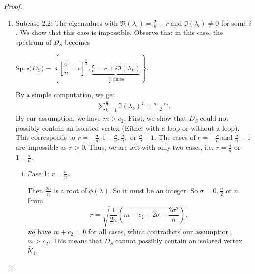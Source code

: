 \documentclass[12pt,a4paper,reqno]{amsart}
\numberwithin{equation}{section}
\theoremstyle{plain}
\theoremstyle{definition}
\newcommand{\<}{\langle}
\renewcommand{\>}{\rangle}
\begin{document}
\begin{proof}
\begin{enumerate}
\begin{enumerate}
\begin{enumerate}[(i)]
                \item $\sigma_i=n_i$ and $D_i=\widetilde{K_{n_i}}$ with spectrum $\{[n_i]^1, [0]^{n_i-1} \}$. By the same argument, we obtain $n_i=2$ and $k=\frac{n}{2}$. Hence, $D_S=\frac{n}{2}\widetilde{K_2}$.
            \end{enumerate}
        Therefore, $D_S=\frac{n}{2} \overleftrightarrow{K_2}, \frac{n}{2}\overleftrightarrow{K_2^+} \text{ or } \frac{n}{2}\widetilde{K_2}$.\\

	\item Subcase 2.2: The eigenvalues with $\Re(\lambda_i)=\frac{\sigma}{n}-r$ and $\Im(\lambda_i) \neq 0$ for some $i$. We show that this case is impossible. Observe that in this case, the spectrum of $D_S$ becomes
	\begin{center}
				$\text{Spec($D_S$)}= \left\{  \left[\dfrac{\sigma}{n}+r \right] ^{\frac{n}{2}}, \underbrace{\frac{\sigma}{n}-r + i\Im(\lambda_k) }_{\frac{n}{2} \text{ times} }\right\}.$
				
			\end{center}
	
        By a simple computation, we get
        \begin{align*}
            \sum_{k=1}^{\frac{n}{2}} \Im(\lambda_k)^2=\frac{m-c_2}{2}.
        \end{align*}
        By our assumption, we have $m>c_2$. First, we show that $D_S$ could not possibly contain an isolated vertex (Either with a loop or without a loop). This corresponds to $r=-\frac{\sigma}{n}, 1-\frac{\sigma}{n}, \frac{\sigma}{n}, \text{ or } \frac{\sigma}{n}-1$. The cases of $r=-\frac{\sigma}{n}$ and $\frac{\sigma}{n}-1$ are impossible as $r>0$. Thus, we are left with only two cases, i.e. $r=\frac{\sigma}{n}$ or $1-\frac{\sigma}{n}$.
        
        \begin{enumerate}[(i)]
            \item Case 1: $r=\frac{\sigma}{n}$. 
            
            Then $\frac{2\sigma}{n}$ is a root of $\phi(\lambda)$. So it must be an integer. So $\sigma=0, \frac{n}{2}$ or $n$.
            From 
            \begin{equation*}
                r=\sqrt{\frac{1}{2n} \left( m+c_2+2\sigma-\frac{2\sigma^2}{n} \right)},
            \end{equation*}
             we have $m+c_2=0$ for all cases, which contradicts our assumption $m>c_2$. This means that $D_S$ cannot possibly contain an isolated vertex $\overleftrightarrow{K_1}$. 
            

\end{enumerate}
\end{enumerate}
\end{enumerate}
\end{proof}
\end{document}
